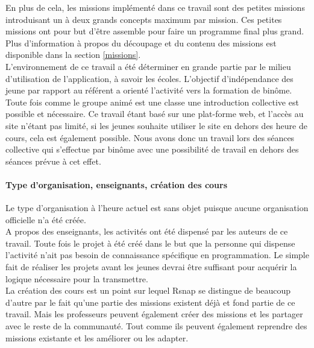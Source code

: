 En plus de cela, les missions implémenté dans ce travail sont des petites missions introduisant un à deux grands concepts maximum par mission. Ces petites missions ont pour but d'être assemble pour faire un programme final plus grand. Plus d'information à propos du découpage et du contenu des missions est disponible dans la section \ref{missions}.\\

L'environnement de ce travail a été déterminer en grande partie par le milieu d'utilisation de l'application, à savoir les écoles. L'objectif d'indépendance des jeune par rapport au référent a orienté l'activité vers la formation de binôme. Toute fois comme le groupe animé est une classe une introduction collective est possible et nécessaire. Ce travail étant basé sur une plat-forme web, et l'accès au site n'étant pas limité, si les jeunes souhaite utiliser le site en dehors des heure de cours, cela est également possible.
Nous avons donc un travail lors des séances collective qui s'effectue par binôme avec une possibilité de travail en dehors des séances prévue à cet effet.

\paragraph{Type d'organisation, enseignants, création des cours}Le type d'organisation à l'heure actuel est sans objet puisque aucune organisation officielle n'a été créée.\\

A propos des enseignants, les activités ont été dispensé par les auteurs de ce travail. Toute fois le projet à été créé dans le but que la personne qui dispense l'activité n'ait pas besoin de connaissance spécifique en programmation. Le simple fait de réaliser les projets avant les jeunes devrai être suffisant pour acquérir la logique nécessaire pour la transmettre.\\

La création des cours est un point sur lequel Rsnap se distingue de beaucoup d'autre par le fait qu'une partie des missions existent déjà et fond partie de ce travail. Mais les professeurs peuvent également créer des missions et les partager avec le reste de la communauté. Tout comme ils peuvent également reprendre des missions existante et les améliorer ou les adapter. %
